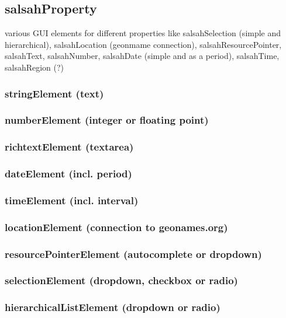 \newpage
\subsection{salsahProperty}
various GUI elements for different properties like salsahSelection (simple and hierarchical), salsahLocation (geonmame connection), salsahResourcePointer, salsahText, salsahNumber, salsahDate (simple and as a period), salsahTime, salsahRegion (?)

\subsubsection{stringElement (text)}


\subsubsection{numberElement (integer or floating point)}


\subsubsection{richtextElement (textarea)}


\subsubsection{dateElement (incl. period)}


\subsubsection{timeElement (incl. interval)}


\subsubsection{locationElement (connection to geonames.org)}


\subsubsection{resourcePointerElement (autocomplete or dropdown)}


\subsubsection{selectionElement (dropdown, checkbox or radio)}


\subsubsection{hierarchicalListElement (dropdown or radio)}
